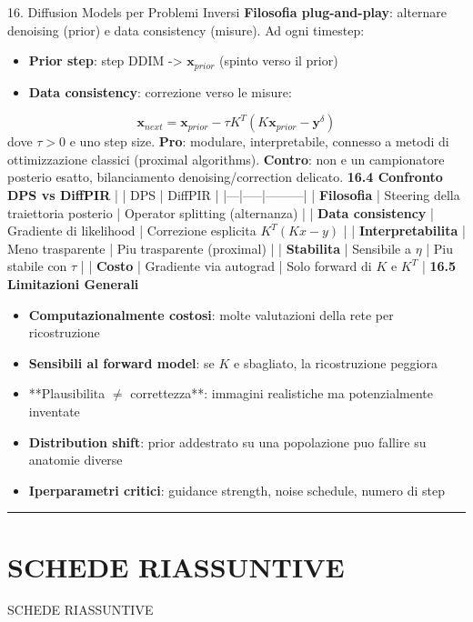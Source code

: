 \documentclass[italian,10pt]{beamer}
\begin{document}
\begin{frame}[allowframebreaks]{16. Diffusion Models per Problemi Inversi}
\textbf{Filosofia plug-and-play}: alternare denoising (prior) e data consistency (misure).
Ad ogni timestep:
\begin{itemize}
\item \textbf{Prior step}: step DDIM -> $\boldsymbol{x}_{prior}$ (spinto verso il prior)
\item \textbf{Data consistency}: correzione verso le misure:
\end{itemize}
\[ \boldsymbol{x}_{next} = \boldsymbol{x}_{prior} - \tau K^T(K\boldsymbol{x}_{prior} - \boldsymbol{y}^\delta) \]
dove $\tau > 0$ e uno step size.
\textbf{Pro}: modulare, interpretabile, connesso a metodi di ottimizzazione classici (proximal algorithms).
\textbf{Contro}: non e un campionatore posterio esatto, bilanciamento denoising/correction delicato.
\textbf{16.4 Confronto DPS vs DiffPIR}
| | DPS | DiffPIR |
|---|-----|---------|
| \textbf{Filosofia} | Steering della traiettoria posterio | Operator splitting (alternanza) |
| \textbf{Data consistency} | Gradiente di likelihood | Correzione esplicita $K^T(Kx - y)$ |
| \textbf{Interpretabilita} | Meno trasparente | Piu trasparente (proximal) |
| \textbf{Stabilita} | Sensibile a $\eta$ | Piu stabile con $\tau$ |
| \textbf{Costo} | Gradiente via autograd | Solo forward di $K$ e $K^T$ |
\textbf{16.5 Limitazioni Generali}
\begin{itemize}
\item \textbf{Computazionalmente costosi}: molte valutazioni della rete per ricostruzione
\item \textbf{Sensibili al forward model}: se $K$ e sbagliato, la ricostruzione peggiora
\item **Plausibilita $\neq$ correttezza**: immagini realistiche ma potenzialmente inventate
\item \textbf{Distribution shift}: prior addestrato su una popolazione puo fallire su anatomie diverse
\item \textbf{Iperparametri critici}: guidance strength, noise schedule, numero di step
\end{itemize}
\medskip\noindent\rule{\textwidth}{0.4pt}\medskip
\end{frame}

\section{SCHEDE RIASSUNTIVE}
\begin{frame}{SCHEDE RIASSUNTIVE}
\tableofcontents[currentsection]
\end{frame}
\end{document}
